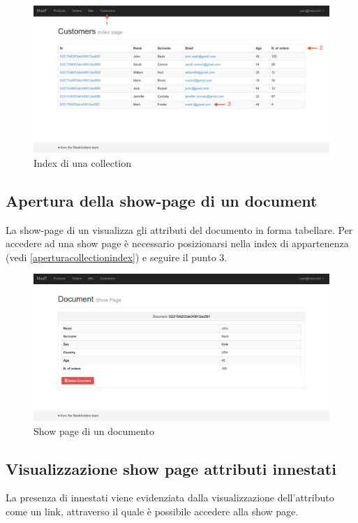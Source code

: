 	\begin{figure}[H]
		\centering \includegraphics[width=1\textwidth]{img/collection.png}
	\caption{ \label{fig:collection} Index di una collection}
	\end{figure}
	

	\subsection{Apertura della show-page di un document} %
	\label{aperturashowpage}
	La show-page di un  visualizza gli attributi del documento in forma tabellare. Per accedere ad una show page è necessario posizionarsi nella  index di appartenenza (vedi \ref{aperturacollectionindex}) e seguire il punto 3.

	\begin{figure}[H]
	\label{fig:showpage}
		\centering \includegraphics[width=1\textwidth]{img/showpage.png}
	\caption{Show page di un documento}
	\end{figure}

	\subsection{Visualizzazione show page attributi innestati} %
	La presenza di  innestati viene evidenziata dalla visualizzazione dell'attributo come un link, attraverso il quale è possibile accedere alla show page. 


